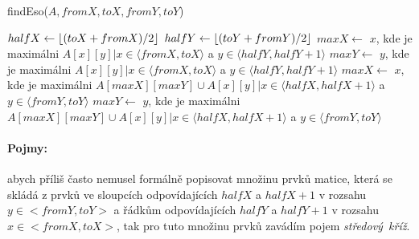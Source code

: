 \documentclass[12pt]{iv003}
\DeclarePairedDelimiter\floor{\lfloor}{\rfloor}
\begin{document}
\begin{small}
\begin{procedure}[H]
    \caption{findEso($A, fromX, toX, fromY, toY$) }
    $halfX \leftarrow \floor*{(toX + fromX)/2}$ \;
    $halfY \leftarrow \floor*{(toY + fromY)/2}$ \;
    $maxX \leftarrow$ $x$, kde je maximálni $A[x][y] | x \in \langle fromX, toX \rangle$ a $y \in \langle halfY, halfY + 1 \rangle$ \;
    $maxY \leftarrow$ $y$, kde je maximálni $A[x][y] | x \in \langle fromX, toX \rangle$ a $y \in \langle halfY, halfY + 1 \rangle$ \;
    $maxX \leftarrow$ $x$, kde je maximálni $A[maxX][maxY] \cup A[x][y] | x \in \langle halfX, halfX +1 \rangle$ a $y \in \langle fromY, toY \rangle$ \;
    $maxY \leftarrow$ $y$, kde je maximálni $A[maxX][maxY] \cup A[x][y] | x \in \langle halfX, halfX +1 \rangle$ a $y \in \langle fromY, toY \rangle$ \;

     {
		 {
		}
    }
\end{procedure}
\end{small}
\paragraph{Pojmy:} abych příliš často nemusel formálně popisovat množinu prvků matice, která se skládá z prvků ve sloupcích odpovídajících $halfX$ a $halfX+1$ v rozsahu $y \in <fromY, toY>$ a řádkům odpovídajících $halfY$ a $halfY+1$ v rozsahu $x \in <fromX, toX>$, tak pro tuto množinu prvků zavádím pojem \textit{středový~kříž}.
\end{document}
